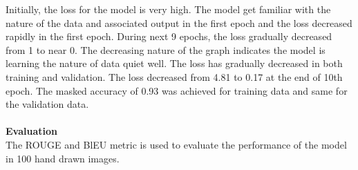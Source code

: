 Initially, the loss for the model is very high. The model get familiar with the nature of the data and associated output in the first epoch and the loss decreased rapidly in the first epoch. During next 9 epochs, the loss gradually decreased from 1 to near 0. The decreasing nature of the graph indicates the model is learning the nature of data quiet well. The loss has gradually decreased in both training and validation. The loss decreased from 4.81 to 0.17 at the end of 10th epoch. The masked accuracy of 0.93 was achieved for training data and same for the validation data.\\
\\
\textbf{Evaluation}\\
The ROUGE and BlEU metric is used to evaluate the performance of the model in 100 hand drawn images.

